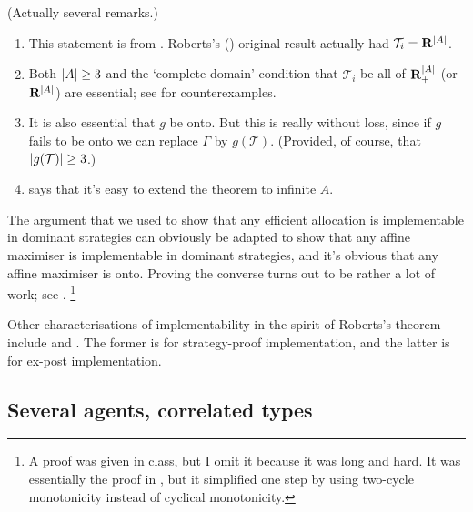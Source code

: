\documentclass[11pt,letterpaper,reqno,oneside]{article}
\begin{document}
\begin{remark}
	(Actually several remarks.)
	\begin{enumerate}
	
		\item This statement is from \textcite[][sec. 4.2.4]{Vohra2011}. Roberts's (\citeyear{Roberts1979}) original result actually had $\mathcal{T}_i = \R^{\abs*{A}}$.

		\item Both $\abs*{A} \geq 3$ and the `complete domain' condition that $\mathcal{T}_i$ be all of $\R_+^{\abs*{A}}$ (or $\R^{\abs*{A}}$) are essential; see \textcite[][pp. 58--9]{Vohra2011} for counterexamples.

		\item It is also essential that $g$ be onto. But this is really without loss, since if $g$ fails to be onto we can replace $\Gamma$ by $g(\mathcal{T})$. (Provided, of course, that $\abs*{g(\mathcal{T})} \geq 3$.)

		\item \textcite[][p. 54]{Vohra2011} says that it's easy to extend the theorem to infinite $A$.

	\end{enumerate}
\end{remark}


The argument that we used to show that any efficient allocation is implementable in dominant strategies can obviously be adapted to show that any affine maximiser is implementable in dominant strategies, and it's obvious that any affine maximiser is onto. Proving the converse turns out to be rather a lot of work; see \textcite[][sec. 4.2.4]{Vohra2011}.%
	\footnote{A proof was given in class, but I omit it because it was long and hard. It was essentially the proof in \textcite{Vohra2011}, but it simplified one step by using two-cycle monotonicity instead of cyclical monotonicity.}

Other characterisations of implementability in the spirit of Roberts's theorem include \textcite{BikhchandaniEtAl2006} and \textcite{ChungEly2006}. The former is for strategy-proof implementation, and the latter is for ex-post implementation.



\pagebreak
\subsection{Several agents, correlated types}
\label{sec:mech_desi:several_agents_correlated_types}
\end{document}
